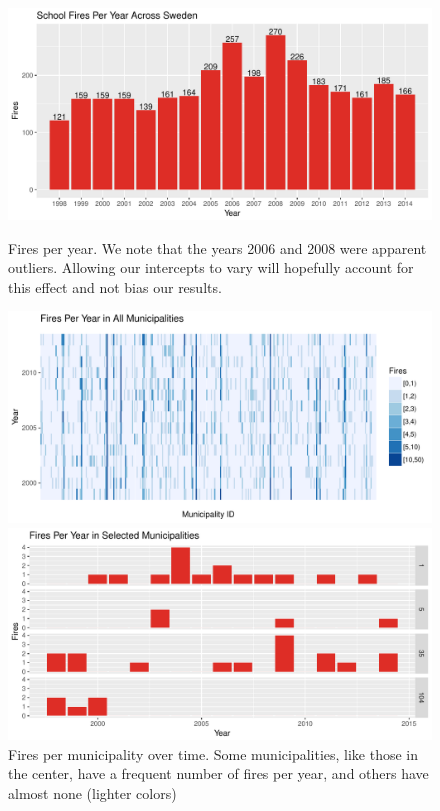 \documentclass[10pt,a4paper, hidelinks]{article} %
\begin{document}
\begin{figure}[H]
	\centering
	\begin{minipage}[c]{0.7\textwidth}
		\includegraphics[width=1\linewidth]{../fig/FiresPerYear}
	\end{minipage} \hfill
	\begin{minipage}[l]{0.29\textwidth}
		\caption{Fires per year. We note that the years 2006 and 2008 were apparent outliers. Allowing our intercepts to vary will hopefully account for this effect and not bias our results.}
		\label{fig:firesperyear}
	\end{minipage}
	\begin{minipage}[c]{0.7\textwidth}
		\includegraphics[width=1\linewidth]{../fig/FiresPerMuni_tile}
	\end{minipage} \hfill
	\begin{minipage}[l]{0.29\textwidth}
		\caption{Fires per municipality over time. Some municipalities, like those in the center, have a frequent number of fires per year, and others have almost none (lighter colors)}
		\label{fig:firespermunitile}
	\end{minipage}
	\begin{minipage}[c]{0.7\textwidth}
		\includegraphics[width=1\linewidth]{../fig/FiresPerMuni}

\end{minipage}
\end{figure}
\end{document}
